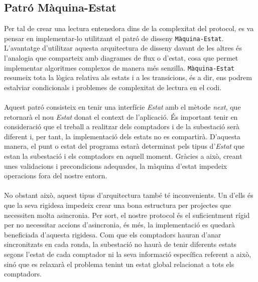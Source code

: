 \subsection{Patró Màquina-Estat}
Per tal de crear una lectura entenedora dins de la complexitat del protocol, es va pensar en implementar-lo utilitzant el patró de disseny \texttt{Màquina-Estat}. L'avantatge d'utilitzar aquesta arquitectura de disseny davant de les altres és l'analogia que comparteix amb diagrames de flux o d'estat, cosa que permet implementar algoritmes complexos de manera més senzilla. \texttt{Màquina-Estat} resumeix tota la lògica relativa als estats i a les transicions, és a dir, ens podrem estalviar condicionals i problemes de complexitat de lectura en el codi.
\\
\\
Aquest patró consisteix en tenir una interfície \textit{Estat} amb el mètode \textit{next}, que retornarà el nou \textit{Estat} donat el context de l'aplicació. És important tenir en consideració que el treball a realitzar dels comptadors i de la subestació serà diferent i, per tant, la implementació dels estats no es compartirà. D'aquesta manera, el punt o estat del programa estarà determinat pels tipus d'\textit{Estat} que estan la subestació i els comptadors en aquell moment. Gràcies a això, creant unes validacions i precondicions adequades, la màquina d’estat impedeix operacions fora del nostre entorn.
\\
\\
No obstant això, aquest tipus d'arquitectura també té inconvenients. Un d'ells és que la seva rigidesa impedeix crear una bona estructura per projectes que necessiten molta asincronia. Per sort, el nostre protocol és el suficientment rígid per no necessitar accions d'asincronia, és més, la implementació es quedarà beneficiada d'aquesta rigidesa. Com que els comptadors hauran d'anar sincronitzats en cada ronda, la subestació no haurà de tenir diferents estats segons l'estat de cada comptador ni la seva informació específica referent a això, sinó que es relaxarà el problema tenint un estat global relacionat a tots els comptadors.
\newpage
